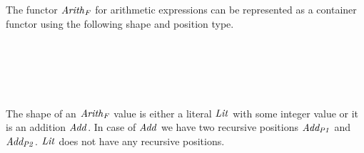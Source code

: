 The functor \ensuremath{\Varid{Arith}_F} for arithmetic expressions can be represented as a
container functor using the following shape and position type.
\begin{hscode}\SaveRestoreHook
{}%
%
%
%
\>[3]{}\;\mathrel{=}\;\mid {}\<[E]%
\\
\>[3]{}\;\mathbin{::}\to \mathbin{*}\<[E]%
\\
\>[3]{}\<[5]%
\>[5]{}\mathbin{::}\;\<[E]%
\\
\>[3]{}\<[5]%
\>[5]{}\mathbin{::}\;\<[E]%
\\
\>[3]{}\;\mathrel{=}\<[E]%
\ColumnHook
\end{hscode}\resethooks
The shape of an \ensuremath{\Varid{Arith}_F} value is either a literal \ensuremath{\Conid{Lit}} with some
integer value or it is an addition \ensuremath{\Conid{Add}}. In case of \ensuremath{\Conid{Add}} we have two
recursive positions \ensuremath{\Varid{Add_{P1}}} and \ensuremath{\Varid{Add_{P2}}}. \ensuremath{\Conid{Lit}} does not have any
recursive positions.

